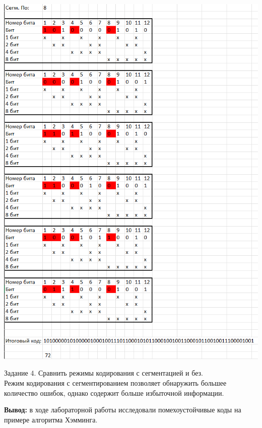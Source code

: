 \documentclass[a4paper,14pt]{extarticle}
\begin{document}
\begin{center}
    \includegraphics[width=140mm]{3}
\end{center}
Задание 4. Сравнить режимы кодирования с сегментацией и без.\\
Режим кодирования с сегментированием позволяет обнаружить большее количество ошибок, однако содержит больше 
избыточной информации.

\textbf{Вывод: } в ходе лабораторной работы исследовали помехоустойчивые коды на примере алгоритма Хэмминга.
\end{document}
